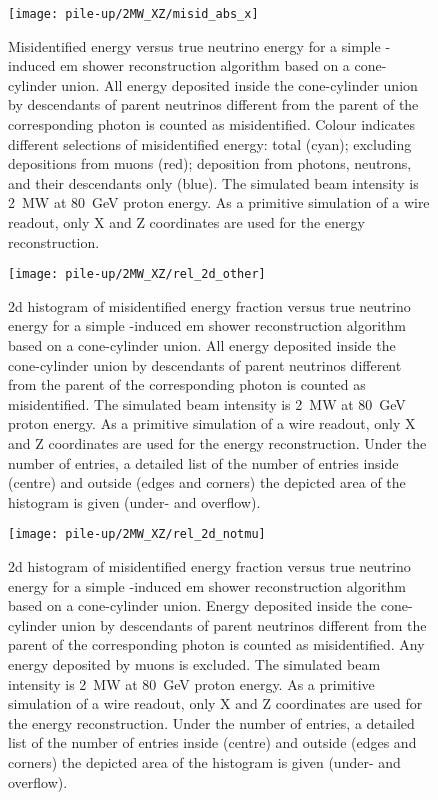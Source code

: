 \begin{figure}[htb]
	\centering
	\texttt{[image: pile-up/2MW\_XZ/misid\_abs\_x]}
	\caption{Misidentified energy versus true neutrino energy for a simple \Pgpz-induced \gls{em} shower reconstruction algorithm based on a cone-cylinder union.
		All energy deposited inside the cone-cylinder union by descendants of parent neutrinos different from the parent of the corresponding \Pgpz photon is counted as misidentified.
		Colour indicates different selections of misidentified energy: total (cyan); excluding depositions from muons (red); deposition from photons, neutrons, and their descendants only (blue).
		The simulated beam intensity is \SI{2}{\mega\watt} at \SI{80}{\giga\electronvolt} proton energy.
		As a primitive simulation of a wire readout, only X and Z coordinates are used for the energy reconstruction.}
\end{figure}

\begin{figure}[htb]
	\centering
	\texttt{[image: pile-up/2MW\_XZ/rel\_2d\_other]}
	\caption{\gls{2d} histogram of misidentified energy fraction versus true neutrino energy for a simple \Pgpz-induced \gls{em} shower reconstruction algorithm based on a cone-cylinder union.
		All energy deposited inside the cone-cylinder union by descendants of parent neutrinos different from the parent of the corresponding \Pgpz photon is counted as misidentified.
		The simulated beam intensity is \SI{2}{\mega\watt} at \SI{80}{\giga\electronvolt} proton energy.
		As a primitive simulation of a wire readout, only X and Z coordinates are used for the energy reconstruction.
		Under the number of entries, a detailed list of the number of entries inside (centre) and outside (edges and corners) the depicted area of the histogram is given (under- and overflow).}
\end{figure}

\begin{figure}[htb]
	\centering
	\texttt{[image: pile-up/2MW\_XZ/rel\_2d\_notmu]}
	\caption{\gls{2d} histogram of misidentified energy fraction versus true neutrino energy for a simple \Pgpz-induced \gls{em} shower reconstruction algorithm based on a cone-cylinder union.
		Energy deposited inside the cone-cylinder union by descendants of parent neutrinos different from the parent of the corresponding \Pgpz photon is counted as misidentified.
		Any energy deposited by muons is excluded.
		The simulated beam intensity is \SI{2}{\mega\watt} at \SI{80}{\giga\electronvolt} proton energy.
		As a primitive simulation of a wire readout, only X and Z coordinates are used for the energy reconstruction.
		Under the number of entries, a detailed list of the number of entries inside (centre) and outside (edges and corners) the depicted area of the histogram is given (under- and overflow).}
\end{figure}

